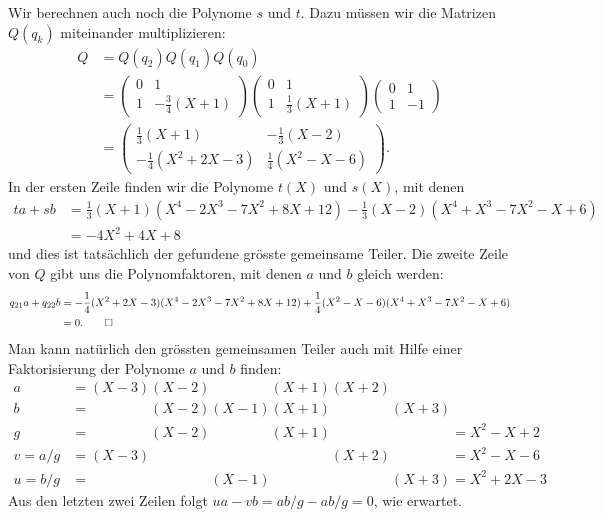 \begin{beispiel}
Wir berechnen auch noch die Polynome $s$ und $t$.
Dazu müssen wir die Matrizen $Q(q_k)$ miteinander multiplizieren:
\begin{align*}
Q
&=Q(q_2) Q(q_1) Q(q_0)
\\
&=
\begin{pmatrix} 0 & 1 \\ 1 & -\frac34(X+1) \end{pmatrix}
\begin{pmatrix} 0 & 1 \\ 1 & \frac13(X+1) \end{pmatrix}
\begin{pmatrix} 0 & 1 \\ 1 & -1 \end{pmatrix}
\\
&=
\begin{pmatrix}
\frac13(X+1)&-\frac13(X-2)\\
-\frac14(X^2+2X-3)&\frac14(X^2-X-6)
\end{pmatrix}.
\end{align*}
In der ersten Zeile finden wir die Polynome $t(X)$ und $s(X)$, mit denen
\begin{align*}
ta+sb
&=
\frac13(X+1)
(X^4-2X^3-7X^2+8X+12)
-\frac13(X-2)
(X^4+X^3-7X^2-X+6)
\\
&=
-4X^2+4X+8
\end{align*}
und dies ist tatsächlich der gefundene grösste gemeinsame Teiler.
Die zweite Zeile von $Q$ gibt uns die Polynomfaktoren, mit denen
$a$ und $b$ gleich werden:
\begin{align*}
q_{21}a+q_{22}b
&=
-\frac14(X^2+2X-3)
(X^4-2X^3-7X^2+8X+12)
+\frac14(X^2-X-6)
(X^4+X^3-7X^2-X+6)
\\
&=0.
\qedhere
\end{align*}
Man kann natürlich den grössten gemeinsamen Teiler auch mit Hilfe einer
Faktorisierung der Polynome $a$ und $b$ finden:
\begin{align*}
a  &=         (X-3) (X-2)\phantom{(X-1)}(X+1)         (X+2) \phantom{(X+3)}\\
b  &=\phantom{(X-3)}(X-2)         (X-1) (X+1)\phantom{(X+2)}         (X+3) \\
g  &=\phantom{(X-3)}(X-2)\phantom{(X-1)}(X+1)\phantom{(X+2)}\phantom{(X+3)}
    = X^2 -X + 2\\
v=a/g&=         (X-3)\phantom{(X-2)(X-1)(X+1)} (X+2) \phantom{(X+3)}
    = X^2-X-6 \\
u=b/g&=\phantom{(X-3)(X-2)} (X-1)\phantom{(X+1)(X+2)}(X+3)
    = X^2+2X-3
\end{align*}
Aus den letzten zwei Zeilen folgt
$ua-vb = ab/g - ab/g = 0$, wie erwartet.
\end{beispiel}


